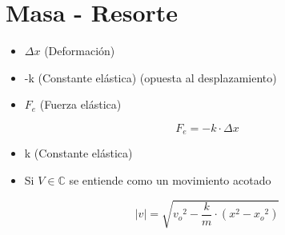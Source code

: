 \section{Masa - Resorte}
    \begin{itemize}
        \item $\Delta x$ (Deformación)
        \item -k (Constante elástica) (opuesta al desplazamiento)
        \item ${F}_{e}$ (Fuerza elástica)
    \end{itemize}
    \begin{equation}
        {F}_{e} = -k \cdot \Delta x
    \end{equation}
    
    \begin{itemize}
        \item k (Constante elástica)
        \item Si $V \in \mathbb{C}$ se entiende como un movimiento acotado
    \end{itemize}
    \begin{equation}
        |v| = \sqrt{{v_o}^2 - \frac{k}{m} \cdot (x^2 - {x_o}^2)}
    \end{equation}

